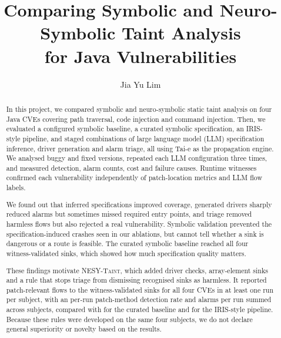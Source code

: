 \documentclass[sigconf]{acmart}
\newcommand{\tool}{\textsc{NESY-Taint}}
\begin{document}
\title[Comparing Symbolic and Neuro-Symbolic Taint Analysis]{Comparing Symbolic and Neuro-Symbolic Taint Analysis\\ for Java Vulnerabilities}
\author{Jia Yu Lim}
\renewcommand{\shortauthors}{Jia Yu Lim}


\begin{abstract}
In this project, we compared symbolic and neuro-symbolic static taint analysis on four Java CVEs covering path traversal, code injection and command injection. Then, we evaluated a configured symbolic baseline, a curated symbolic specification, an IRIS-style pipeline, and staged combinations of large language model (LLM) specification inference, driver generation and alarm triage, all using Tai-e as the propagation engine. We analysed buggy and fixed versions, repeated each LLM configuration three times, and measured detection, alarm counts, cost and failure causes. Runtime witnesses confirmed each vulnerability independently of patch-location metrics and LLM flow labels.

We found out that inferred specifications improved coverage, generated drivers sharply reduced alarms but sometimes missed required entry points, and triage removed harmless flows but also rejected a real vulnerability. Symbolic validation prevented the specification-induced crashes seen in our ablations, but cannot tell whether a sink is dangerous or a route is feasible. The curated symbolic baseline reached all four witness-validated sinks, which showed how much specification quality matters.

These findings motivate \tool{}, which added driver checks, array-element sinks and a rule that stops triage from dismissing recognised sinks as harmless. It reported patch-relevant flows to the witness-validated sinks for all four CVEs in at least one run per subject, with an \VFourRate{} per-run patch-method detection rate and \VFourAlarms{} alarms per run summed across subjects, compared with \BTwoAlarms{} for the curated baseline and \IrisAlarms{} for the IRIS-style pipeline. Because these rules were developed on the same four subjects, we do not declare general superiority or novelty based on the results.
\end{abstract}
\end{document}
